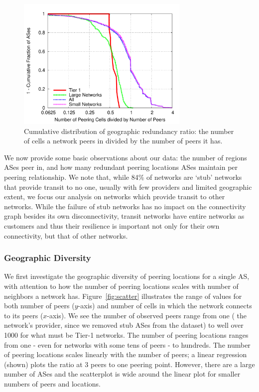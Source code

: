 \begin{figure}[tb]
\centering
\includegraphics[width=3.25in]{ratio}
\caption[]{\label{fig:ratio} Cumulative distribution of geographic redundancy ratio: the number of cells a network peers in divided by the number of peers it has.} 
\end{figure}




 


    We now provide some basic observations about our data: the number of regions ASes peer in, and how many redundant peering locations ASes maintain per peering relationship.
    We note that, while 84\% of networks are `stub' networks that provide transit to no one, usually with few providers and limited geographic extent, we focus our analysis on networks which provide transit to other networks.
    While the failure of stub networks has no impact on the connectivity graph besides its own disconnectivity, transit networks have entire networks as customers and thus their resilience is important not only for their own connectivity, but that of other networks.

\subsubsection*{Geographic Diversity}
    We first investigate the geographic diversity of peering locations for a single AS, with attention to how the number of peering locations scales with number of neighbors a network has.
    Figure~\ref{fig:scatter} illustrates the range of values for both number of peers ($y$-axis) and number of cells in which the network connects to its peers ($x$-axis).
    We see the number of observed peers range from one (\ie{} the network's provider, since we removed stub ASes from the dataset) to well over 1000 for what must be Tier-1 networks.
    The number of peering locations ranges from one - even for networks with some tens of peers - to hundreds.
    The number of peering locations scales linearly with the number of peers; a linear regression (shown) plots the ratio  at 3 peers to one peering point. 
    However, there are a large number of ASes and the scatterplot is wide around the linear plot for smaller numbers of peers and locations.


